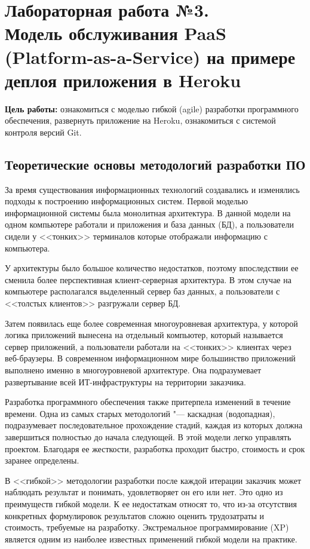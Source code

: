 \section[Лабораторная работа №3]{Лабораторная работа №3. \\
Модель обслуживания PaaS (Platform-as-a-Service) на примере деплоя приложения в Heroku}

\textbf{Цель работы:} ознакомиться с моделью гибкой (agile) разработки программного обеспечения, развернуть приложение на Heroku, ознакомиться с системой контроля версий Git.

\subsection{Теоретические основы методологий разработки ПО}
За время существования информационных технологий создавались и изменялись подходы к построению информационных систем.
Первой моделью информационной системы была монолитная архитектура.
В данной модели на одном компьютере работали и приложения и база данных (БД), а пользователи сидели у <<тонких>> терминалов которые отображали информацию с компьютера.

У архитектуры было большое количество недостатков, поэтому впоследствии ее сменила более перспективная клиент-серверная архитектура.
В этом случае на компьютере располагался выделенный сервер баз данных, а пользователи с <<толстых клиентов>> разгружали сервер БД.

Затем появилась еще более современная многоуровневая архитектура, у которой логика приложений вынесена на отдельный компьютер, который называется сервер приложений, а пользователи работали на <<тонких>> клиентах через веб-браузеры.
В современном информационном мире большинство приложений выполнено именно в многоуровневой архитектуре.
Она подразумевает развертывание всей ИТ-инфраструктуры на территории заказчика.

Разработка программного обеспечения также притерпела изменений в течение времени.
Одна из самых старых методологий "--- каскадная (водопадная), подразумевает последовательное прохождение стадий, каждая из которых должна завершиться полностью до начала следующей.
В этой модели легко управлять проектом.
Благодаря ее жесткости, разработка проходит быстро, стоимость и срок заранее определены.

В <<гибкой>> методологии разработки после каждой итерации заказчик может наблюдать результат и понимать, удовлетворяет он его или нет.
Это одно из преимуществ гибкой модели.
К ее недостаткам относят то, что из-за отсутствия конкретных формулировок результатов сложно оценить трудозатраты и стоимость, требуемые на разработку.
Экстремальное программирование (XP) является одним из наиболее известных применений гибкой модели на практике.

